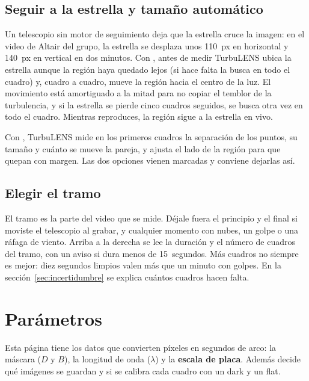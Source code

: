 \subsection{Seguir a la estrella y tamaño automático}

Un telescopio sin motor de seguimiento deja que la estrella cruce la imagen: en el video de Altair del grupo, la
estrella se desplaza unos 110~px en horizontal y 140~px en vertical en dos minutos. Con ,
antes de medir TurbuLENS ubica la estrella aunque la región haya quedado lejos (si hace falta la busca en todo el
cuadro) y, cuadro a cuadro, mueve la región hacia el centro de la luz. El movimiento está amortiguado a la mitad para no
copiar el temblor de la turbulencia, y si la estrella se pierde cinco cuadros seguidos, se busca otra vez en todo el
cuadro. Mientras reproduces, la región sigue a la estrella en vivo.

Con , TurbuLENS mide en los primeros cuadros la separación de los puntos, su tamaño y cuánto se
mueve la pareja, y ajusta el lado de la región para que quepan con margen. Las dos opciones vienen marcadas y conviene
dejarlas así.

\subsection{Elegir el tramo}

El tramo es la parte del video que se mide. Déjale fuera el principio y el final si moviste el telescopio al grabar,
y cualquier momento con nubes, un golpe o una ráfaga de viento. Arriba a la derecha se lee la duración y el número de
cuadros del tramo, con un aviso si dura menos de 15~segundos. Más cuadros no siempre es mejor: diez segundos limpios
valen más que un minuto con golpes. En la sección~\ref{sec:incertidumbre} se explica cuántos cuadros hacen falta.

\section{Parámetros}\label{sec:parametros}

Esta página tiene los datos que convierten píxeles en segundos de arco: la máscara ($D$ y $B$), la longitud de onda
($\lambda$) y la \textbf{escala de placa}. Además decide qué imágenes se guardan y si se calibra cada cuadro con un dark y
un flat.

